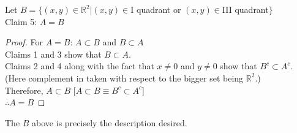 Let $B = \{(x, y) \in \mathbb{R}^2|(x, y) \in $I quadrant or $(x, y) \in $III quadrant$\}$\\
Claim 5: $A = B$
\begin{proof}
For $A=B$: $A \subset B$ and $B \subset A$\\
Claims 1 and 3 show that $B \subset A$.\\
Claims 2 and 4 along with the fact that $x\neq0$ and $y\neq0$ show that $B^c\subset A^c$. (Here complement in taken with respect to the bigger set being $\mathbb{R}^2$.)\\
Therefore, $A \subset B$ \hfill [$A\subset B \equiv B^c\subset A^c$]\\
$\therefore A = B$
\end{proof}
The $B$ above is precisely the description desired.

\dotfill

